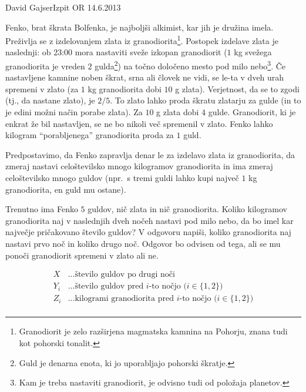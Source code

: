 \begin{naloga}{David Gajser}{Izpit OR 14.6.2013}
\begin{vprasanje}
Fenko, brat škrata Bolfenka, je najboljši alkimist, kar jih je družina imela.
Preživlja se z izdelovanjem zlata iz granodiorita\footnote{
Granodiorit je zelo razširjena magmatska kamnina na Pohorju,
znana tudi kot pohorski tonalit.
}.
Postopek izdelave zlata je naslednji:
ob 23:00 mora nastaviti sveže izkopan granodiorit
($1$ kg svežega granodiorita je vreden $2$ gulda\footnote{
Guld je denarna enota, ki jo uporabljajo pohorski škratje.
})
na točno določeno mesto pod milo nebo\footnote{
Kam je treba nastaviti granodiorit, je odvisno tudi od položaja planetov.
}.
Če nastavljene kamnine noben škrat, srna ali človek ne vidi,
se le-ta v dveh urah spremeni v zlato
(za $1$ kg granodiorita dobi $10$ g zlata).
Verjetnost, da se to zgodi (tj., da nastane zlato), je $2/5$.
To zlato lahko proda škratu zlatarju za gulde
(in to je edini možni način porabe zlata).
Za $10$ g zlata dobi $4$ gulde.
Granodiorit, ki je enkrat že bil nastavljen,
se ne bo nikoli več spremenil v zlato.
Fenko lahko kilogram ``porabljenega'' granodiorita proda za $1$ guld.

Predpostavimo, da Fenko zapravlja denar le za izdelavo zlata iz granodiorita,
da zmeraj nastavi celoštevilsko mnogo kilogramov granodiorita
in ima zmeraj celoštevilsko mnogo guldov
(npr.~s tremi guldi lahko kupi največ $1$ kg granodiorita, en guld mu ostane).

Trenutno ima Fenko $5$ guldov, nič zlata in nič granodiorita.
Koliko kilogramov granodiorita
naj v naslednjih dveh nočeh nastavi pod milo nebo,
da bo imel kar največje pričakovano število guldov?
V odgovoru napiši,
koliko granodiorita naj nastavi prvo noč in koliko drugo noč.
Odgovor bo odvisen od tega,
ali se mu ponoči granodiorit spremeni v zlato ali ne.
\end{vprasanje}

\begin{odgovor}
 \begin{align*} 
 X &\dots \text{število guldov po drugi noči} \\ 
 Y_i &\dots \text{število guldov pred $i$-to nočjo ($i \in \{1, 2\}$)} \\ 
 Z_i &\dots \text{kilogrami granodiorita pred $i$-to nočjo ($i \in \{1, 2\}$)} \\ 
 \end{align*} 


\end{odgovor}
\end{naloga}
